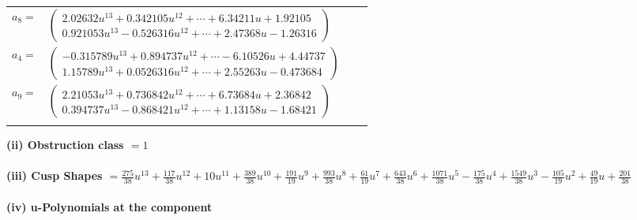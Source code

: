 \documentclass[1p]{elsarticle_modified}
\theoremstyle{definition}
\begin{document}
\begin{tabular}{m{7pt} m{180pt} m{7pt} m{180pt} }
\flushright $a_{8}=$&$\begin{pmatrix}2.02632 u^{13}+0.342105 u^{12}+\cdots+6.34211 u+1.92105\\0.921053 u^{13}-0.526316 u^{12}+\cdots+2.47368 u-1.26316\end{pmatrix}$ \\
\flushright $a_{4}=$&$\begin{pmatrix}-0.315789 u^{13}+0.894737 u^{12}+\cdots-6.10526 u+4.44737\\1.15789 u^{13}+0.0526316 u^{12}+\cdots+2.55263 u-0.473684\end{pmatrix}$ \\
\flushright $a_{9}=$&$\begin{pmatrix}2.21053 u^{13}+0.736842 u^{12}+\cdots+6.73684 u+2.36842\\0.394737 u^{13}-0.868421 u^{12}+\cdots+1.13158 u-1.68421\end{pmatrix}$\\&\end{tabular}
\flushleft \textbf{(ii) Obstruction class $= 1$}\\~\\
\flushleft \textbf{(iii) Cusp Shapes $= \frac{275}{38} u^{13}+\frac{117}{38} u^{12}+10 u^{11}+\frac{389}{38} u^{10}+\frac{191}{19} u^9+\frac{993}{38} u^8+\frac{61}{19} u^7+\frac{643}{38} u^6+\frac{1071}{38} u^5-\frac{175}{38} u^4+\frac{1549}{38} u^3-\frac{105}{19} u^2+\frac{49}{19} u+\frac{201}{38}$}\\~\\
\newpage\renewcommand{\arraystretch}{1}
\flushleft \textbf{(iv) u-Polynomials at the component}\newline \\
\end{document}
